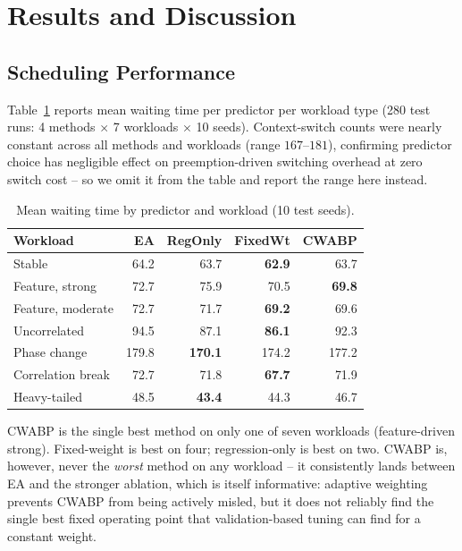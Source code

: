 \documentclass[10pt,twocolumn]{article}
\begin{document}
\section{Results and Discussion}

\subsection{Scheduling Performance}
Table~\ref{tab:main} reports mean waiting time per predictor per workload type (280 test runs: 4 methods $\times$ 7 workloads $\times$ 10 seeds). Context-switch counts were nearly constant across all methods and workloads (range $167$--$181$), confirming predictor choice has negligible effect on preemption-driven switching overhead at zero switch cost -- so we omit it from the table and report the range here instead.

\begin{table}[h]
\centering
\caption{Mean waiting time by predictor and workload (10 test seeds).}
\label{tab:main}
\scriptsize
\setlength{\tabcolsep}{3.2pt}
\begin{tabular}{lrrrr}
\toprule
\textbf{Workload} & \textbf{EA} & \textbf{RegOnly} & \textbf{FixedWt} & \textbf{CWABP} \\
\midrule
Stable & 64.2 & 63.7 & \textbf{62.9} & 63.7 \\
Feature, strong & 72.7 & 75.9 & 70.5 & \textbf{69.8} \\
Feature, moderate & 72.7 & 71.7 & \textbf{69.2} & 69.6 \\
Uncorrelated & 94.5 & 87.1 & \textbf{86.1} & 92.3 \\
Phase change & 179.8 & \textbf{170.1} & 174.2 & 177.2 \\
Correlation break & 72.7 & 71.8 & \textbf{67.7} & 71.9 \\
Heavy-tailed & 48.5 & \textbf{43.4} & 44.3 & 46.7 \\
\bottomrule
\end{tabular}
\end{table}

CWABP is the single best method on only one of seven workloads (feature-driven strong). Fixed-weight is best on four; regression-only is best on two. CWABP is, however, never the \emph{worst} method on any workload -- it consistently lands between EA and the stronger ablation, which is itself informative: adaptive weighting prevents CWABP from being actively misled, but it does not reliably find the single best fixed operating point that validation-based tuning can find for a constant weight.
\end{document}
